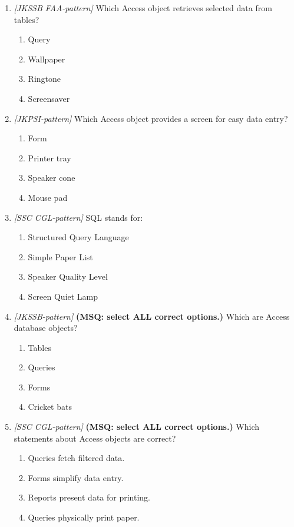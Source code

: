 \documentclass[11pt]{article}
\begin{document}
\begin{enumerate}[label=\textbf{Q\arabic*.}, leftmargin=*]
\item \textit{[JKSSB FAA-pattern]} Which Access object retrieves selected data from tables?
  \begin{enumerate}[label=\Alph*.]
    \item Query
    \item Wallpaper
    \item Ringtone
    \item Screensaver
  \end{enumerate}
\item \textit{[JKPSI-pattern]} Which Access object provides a screen for easy data entry?
  \begin{enumerate}[label=\Alph*.]
    \item Form
    \item Printer tray
    \item Speaker cone
    \item Mouse pad
  \end{enumerate}
\item \textit{[SSC CGL-pattern]} SQL stands for:
  \begin{enumerate}[label=\Alph*.]
    \item Structured Query Language
    \item Simple Paper List
    \item Speaker Quality Level
    \item Screen Quiet Lamp
  \end{enumerate}
\item \textit{[JKSSB-pattern]} \textbf{(MSQ: select ALL correct options.)} Which are Access database objects?
  \begin{enumerate}[label=\Alph*.]
    \item Tables
    \item Queries
    \item Forms
    \item Cricket bats
  \end{enumerate}
\item \textit{[SSC CGL-pattern]} \textbf{(MSQ: select ALL correct options.)} Which statements about Access objects are correct?
  \begin{enumerate}[label=\Alph*.]
    \item Queries fetch filtered data.
    \item Forms simplify data entry.
    \item Reports present data for printing.
    \item Queries physically print paper.
  \end{enumerate}
\end{enumerate}
\def\JKSSBLessonID{30}\def\JKSSBAnswers{0}
\end{document}
